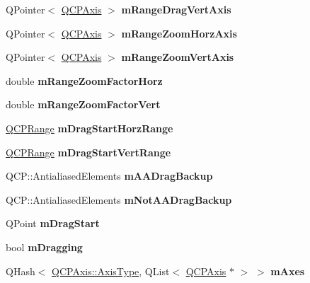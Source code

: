 \begin{DoxyCompactItemize}
Q\+Pointer$<$ \mbox{\hyperlink{class_q_c_p_axis}{Q\+C\+P\+Axis}} $>$ {\bfseries m\+Range\+Drag\+Vert\+Axis}
\item 
\mbox{\label{class_q_c_p_axis_rect_ae22f882bab20518559f3fbb84243d0ab}} 
Q\+Pointer$<$ \mbox{\hyperlink{class_q_c_p_axis}{Q\+C\+P\+Axis}} $>$ {\bfseries m\+Range\+Zoom\+Horz\+Axis}
\item 
\mbox{\label{class_q_c_p_axis_rect_a8b9acd16a203a9692bd35a9465f54bc1}} 
Q\+Pointer$<$ \mbox{\hyperlink{class_q_c_p_axis}{Q\+C\+P\+Axis}} $>$ {\bfseries m\+Range\+Zoom\+Vert\+Axis}
\item 
\mbox{\label{class_q_c_p_axis_rect_ad08d0250ed7b99de387d0ea6c7fd4dc1}} 
double {\bfseries m\+Range\+Zoom\+Factor\+Horz}
\item 
\mbox{\label{class_q_c_p_axis_rect_a32f063629581d5bf82b12769940b34ad}} 
double {\bfseries m\+Range\+Zoom\+Factor\+Vert}
\item 
\mbox{\label{class_q_c_p_axis_rect_a41936cf473ec638bec382f5a40cdb1f3}} 
\mbox{\hyperlink{class_q_c_p_range}{Q\+C\+P\+Range}} {\bfseries m\+Drag\+Start\+Horz\+Range}
\item 
\mbox{\label{class_q_c_p_axis_rect_a1a5ae4c74b8bd46baf91bf4e4f4165f0}} 
\mbox{\hyperlink{class_q_c_p_range}{Q\+C\+P\+Range}} {\bfseries m\+Drag\+Start\+Vert\+Range}
\item 
\mbox{\label{class_q_c_p_axis_rect_aa4a24f76360cfebe1bcf17a77fa7521b}} 
Q\+C\+P\+::\+Antialiased\+Elements {\bfseries m\+A\+A\+Drag\+Backup}
\item 
\mbox{\label{class_q_c_p_axis_rect_a6fcb12e052e276d57efbb128be31d6f5}} 
Q\+C\+P\+::\+Antialiased\+Elements {\bfseries m\+Not\+A\+A\+Drag\+Backup}
\item 
\mbox{\label{class_q_c_p_axis_rect_a032896b28f83a58010d8d533b78c49df}} 
Q\+Point {\bfseries m\+Drag\+Start}
\item 
\mbox{\label{class_q_c_p_axis_rect_ab49a6698194cf0e9e38a1d734c0888a8}} 
bool {\bfseries m\+Dragging}
\item 
\mbox{\label{class_q_c_p_axis_rect_afe7a24d2a2bea98fc552fa826350ba81}} 
Q\+Hash$<$ \mbox{\hyperlink{class_q_c_p_axis_ae2bcc1728b382f10f064612b368bc18a}{Q\+C\+P\+Axis\+::\+Axis\+Type}}, Q\+List$<$ \mbox{\hyperlink{class_q_c_p_axis}{Q\+C\+P\+Axis}} $\ast$ $>$ $>$ {\bfseries m\+Axes}
\end{DoxyCompactItemize}

